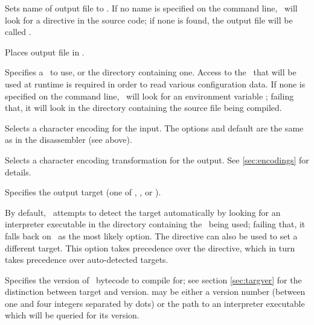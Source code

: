  \begin{nicelist}
  \item[\clbarg{o}{output}{FILE}]
    Sets name of output file to .  If no name is specified on the
    command line, \compiler\ will look for a  directive in the
    source code; if none is found, the output file will be called
    .
  \item[\clbarg{d}{outdir}{DIR}]
    Places output file in .
  \item[\clbarg{i}{ini}{FILE}]\label{usage:inifile}
    Specifies a \gameexe\ to use, or the directory containing one.  Access to 
    the \gameexe\ that will be used at runtime is required in order to read 
    various configuration data.  If none is specified on the command line, 
    \compiler\ will look for an environment variable ; failing 
    that, it will look in the directory containing the source file being 
    compiled.    
  \item[\clbarg{e}{encoding}{ENC}]
    Selects a character encoding for the input.  The options and default are the
    same as in the disassembler (see above).
  \item[\clbarg{x}{transform-output}{ENC}]
    Selects a character encoding transformation for the output. See 
    \ref{sec:encodings} for details.
  \item[\clbarg{t}{target}{TARGET}]
    Specifies the output target (one of , , or
    ).
    
    By default, \compiler\ attempts to detect the target automatically by 
    looking for an interpreter executable in the directory containing the 
    \gameexe\ being used; failing that, it falls back on \reallive\ as the 
    most likely option.  The  directive can also be used to set a 
    different target.  This option takes precedence over the directive, which in 
    turn takes precedence over auto-detected targets.
  \item[\clbarg{f}{target-version}{VER}]
    Specifies the version of \reallive\ bytecode to compile for; see section
    \ref{sec:targver} for the distinction between target and version.  
    may be either a version number (between one and four integers separated by
    dots) or the path to an interpreter executable which will be queried for
    its version.
    

\end{nicelist}
